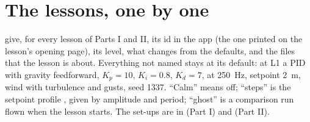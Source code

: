 \clearpage
\section*{The lessons, one by one}

 give, for every lesson of Parts I and II, its id in the app (the one printed on the lesson's opening page), its level, what  changes from the defaults, and the files that the lesson is about. Everything not named stays at its default: at L1 a PID with gravity feedforward, $K_p = 10$, $K_i = 0.8$, $K_d = 7$, at \SI{250}{Hz}, setpoint \SI{2}{m}, wind with turbulence and gusts, seed 1337. \enquote{Calm} means  off; \enquote{steps} is the setpoint profile , given by amplitude and period; \enquote{ghost} is a comparison run flown when the lesson starts. The set-ups are in  (Part I) and  (Part II).

